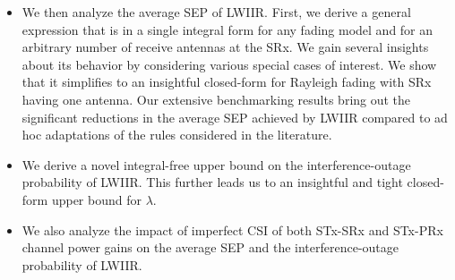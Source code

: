 \documentclass[12pt,draftcls,peerreview,onecolumn]{IEEEtran}
\newcommand{\lam}{\lambda}
\newcommand{\Nt}{{N_t}}
\begin{document}
\begin{itemize}
%
\item We then analyze the average SEP of LWIIR. First, we derive a general expression that is in a single integral form for any fading model and for an arbitrary number of receive antennas at the SRx. We gain several insights about its behavior by considering various special cases of interest. We show that it simplifies to an insightful closed-form for Rayleigh fading with SRx having one antenna. %
Our extensive benchmarking results bring out the significant reductions in the average SEP achieved by LWIIR compared to ad hoc adaptations of the rules considered in the literature. 
% 
\item We derive a novel integral-free upper bound on the interference-outage probability of LWIIR. This further leads us to an insightful and tight closed-form upper bound for $\lam$.
% 
%

\item We also analyze the impact of imperfect CSI of both STx-SRx and STx-PRx channel power gains on the average SEP and the interference-outage probability of LWIIR.

\end{itemize}


\end{document}
